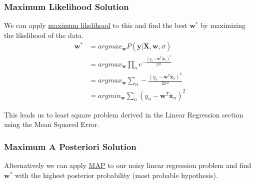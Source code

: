 \documentclass[12pt]{article}
\begin{document}
        \subsubsection{Maximum Likelihood Solution}
            We can apply \hyperref[sec:ML]{maximum likelihood} to this and find the best $\boldsymbol{w}^*$ by
            maximizing the likelihood of the data.
            \begin{align*}
                \boldsymbol{w^*} &= argmax_{\boldsymbol{w}} P(\boldsymbol{y}|\overline{\boldsymbol{X}}, \boldsymbol{w}, \sigma) \\
                &= argmax_{\boldsymbol{w}} \prod_{n} e^{-\frac{(y_n - \boldsymbol{w}^T] \overline{\boldsymbol{x}}_n)^2}{2\sigma^2}} \\
                &= argmax_{\boldsymbol{w}} \sum_{n} -\frac{(y_n - \boldsymbol{w}^T \overline{\boldsymbol{x}}_n)^2}{2\sigma^2} \\
                &= argmin_{\boldsymbol{w}} \sum_{n} (y_n - \boldsymbol{w}^T \overline{\boldsymbol{x}}_n)^2
            \end{align*}

            This leads us to least square problem derived in the Linear Regression section using the Mean Squared Error.

        \subsubsection{Maximum A Posteriori Solution}
            Alternatively we can apply \hyperref[sec:MAP]{MAP} to our noisy linear regression problem and find
            $\boldsymbol{w}^*$ with the highest posterior probability (most probable hypothesis).
            
\end{document}
